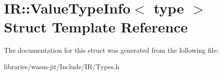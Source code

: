 \hypertarget{struct_i_r_1_1_value_type_info}{}\section{IR\+:\+:Value\+Type\+Info$<$ type $>$ Struct Template Reference}
\label{struct_i_r_1_1_value_type_info}


The documentation for this struct was generated from the following file\+:\begin{DoxyCompactItemize}
\item 
libraries/wasm-\/jit/\+Include/\+I\+R/Types.\+h\end{DoxyCompactItemize}
